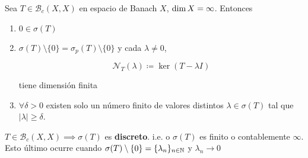 \begin{ftheorem}
   Sea $T\in\mathcal{B}_c(X,X)$ en espacio de Banach $X$, $\operatorname{dim} X=\infty$. Entonces 

   \begin{enumerate}[label=(\alph*)]
      \item $0\in \sigma(T)$
      \item $\sigma(T)\setminus\{0\}=\sigma_p(T)\setminus\{0\}$ y cada $\lambda\neq 0$,
      
      \[\mathcal{N}_T(\lambda)\coloneqq\ker (T-\lambda I)\]

      tiene dimensión finita

      \item $\forall \delta>0$ existen solo un número finito de valores distintos $\lambda\in \sigma(T)$ tal que $|\lambda|\geq \delta$.
   \end{enumerate}
\end{ftheorem}

\begin{fcorollary}
   $T\in\mathcal{B}_c(X,X)\implies \sigma(T)$ es \textbf{discreto}. i.e. o $\sigma(T)$ es finito o contablemente $\infty$. Esto último ocurre cuando $\sigma(T)\setminus\{0\}=\{\lambda_n\}_{n\in\mathbb{N}}$ y $\lambda_n\to 0$
\end{fcorollary}

